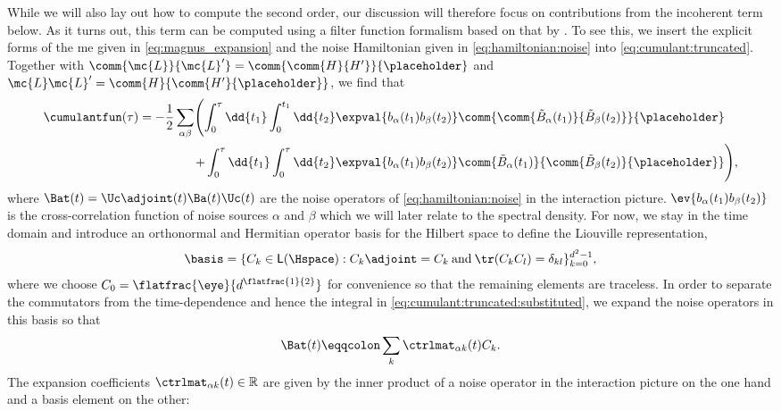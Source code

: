 While we will also lay out how to compute the second order, our discussion will therefore focus on contributions from the incoherent term below. As it turns out, this term can be computed using a filter function formalism based on that by \citeauthor{Green2013}. To see this, we insert the explicit forms of the \gls{me} given in \cref{eq:magnus_expansion} and the noise Hamiltonian given in \cref{eq:hamiltonian:noise} into \cref{eq:cumulant:truncated}. Together with $\comm{\mc{L}}{\mc{L}'} = \comm{\comm{H}{H'}}{\placeholder}$ and $\mc{L}\mc{L}' = \comm{H}{\comm{H'}{\placeholder}}$, we find that
\begin{align}
    \cumulantfun(\tau) = -\frac{1}{2}\sum_{\alpha\beta}\Biggl(\int_0^\tau\dd{t_1}\int_0^{t_1}\dd{t_2}
                              \expval{b_\alpha(t_1) b_\beta(t_2)} & \comm{\comm{\tilde{B}_\alpha(t_1)}{\tilde{B}_\beta(t_2)}}{\placeholder} \notag\\
                                                             +\int_0^\tau\dd{t_1}\int_0^\tau\dd{t_2}
                              \expval{b_\alpha(t_1) b_\beta(t_2)} & \comm{\tilde{B}_\alpha(t_1)}{\comm{\tilde{B}_\beta(t_2)}{\placeholder}}\Biggr), \label{eq:cumulant:truncated:substituted}
\end{align}
where $\Bat(t) = \Uc\adjoint(t)\Ba(t)\Uc(t)$ are the noise operators of \cref{eq:hamiltonian:noise} in the interaction picture. $\ev{b_\alpha(t_1)b_\beta(t_2)}$ is the cross-correlation function of noise sources $\alpha$ and $\beta$ which we will later relate to the spectral density. For now, we stay in the time domain and introduce an orthonormal and Hermitian operator basis for the Hilbert space \Hspace to define the Liouville representation,
\begin{equation}\label{eq:basis}
    \basis = \lbrace C_k\in\mathsf{L}(\Hspace): C_k\adjoint = C_k\:\text{and}\:\tr(C_k C_l) = \delta_{kl}\rbrace_{k=0}^{d^2-1},
\end{equation}
where we choose $C_0 = \flatfrac{\eye}{d^{\flatfrac{1}{2}}}$ for convenience so that the remaining elements are traceless. In order to separate the commutators from the time-dependence and hence the integral in \cref{eq:cumulant:truncated:substituted}, we expand the noise operators in this basis so that
\begin{equation}\label{eq:noise_operators:expanded}
    \Bat(t) \eqqcolon \sum_k\ctrlmat_{\alpha k}(t) C_k.
\end{equation}
The expansion coefficients $\ctrlmat_{\alpha k}(t)\in\mathbb{R}$ are given by the inner product of a noise operator in the interaction picture on the one hand and a basis element on the other:
